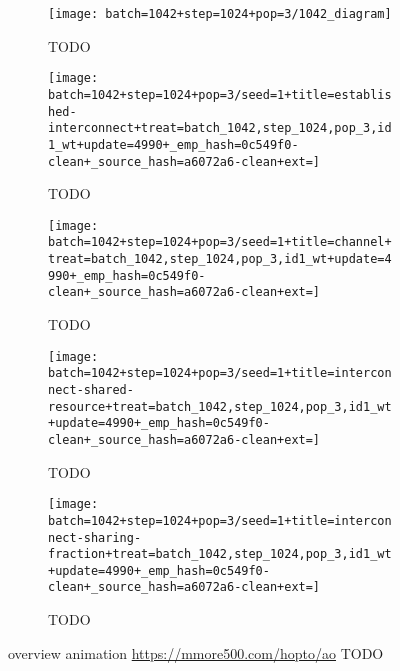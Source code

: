 \begin{figure}[!htbp]
\begin{center}
\begin{subfigure}[b]{\linewidth}
  \texttt{[image: batch=1042+step=1024+pop=3/1042\_diagram]}
  \caption{TODO}
  \label{fig:TODO}
\end{subfigure}
\begin{subfigure}[b]{0.33\linewidth}

  \texttt{[image: batch=1042+step=1024+pop=3/seed=1+title=established-interconnect+treat=batch\_1042,step\_1024,pop\_3,id1\_wt+update=4990+\_emp\_hash=0c549f0-clean+\_source\_hash=a6072a6-clean+ext=]}
  \caption{TODO}
  \label{fig:TODO}
\end{subfigure}
\begin{subfigure}[b]{0.33\linewidth}
  \texttt{[image: batch=1042+step=1024+pop=3/seed=1+title=channel+treat=batch\_1042,step\_1024,pop\_3,id1\_wt+update=4990+\_emp\_hash=0c549f0-clean+\_source\_hash=a6072a6-clean+ext=]}
  \caption{TODO}
  \label{fig:TODO}
\end{subfigure}
\begin{subfigure}[b]{0.33\linewidth}
  \texttt{[image: batch=1042+step=1024+pop=3/seed=1+title=interconnect-shared-resource+treat=batch\_1042,step\_1024,pop\_3,id1\_wt+update=4990+\_emp\_hash=0c549f0-clean+\_source\_hash=a6072a6-clean+ext=]}
  \caption{TODO}
  \label{fig:TODO}
\end{subfigure}
\begin{subfigure}[b]{0.33\linewidth}
  \texttt{[image: batch=1042+step=1024+pop=3/seed=1+title=interconnect-sharing-fraction+treat=batch\_1042,step\_1024,pop\_3,id1\_wt+update=4990+\_emp\_hash=0c549f0-clean+\_source\_hash=a6072a6-clean+ext=]}
  \caption{TODO}
  \label{fig:TODO}
\end{subfigure}
\caption{
overview animation \url{https://mmore500.com/hopto/ao}
	TODO
}
\label{fig:case_study_1042}
\end{center}
\end{figure}
